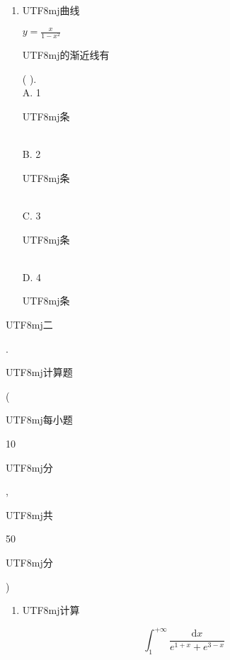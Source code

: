 \documentclass[10pt]{article}
\begin{document}
\begin{enumerate}
  \item \begin{CJK}{UTF8}{mj}曲线\end{CJK} $y=\frac{x}{1-x^{2}}$ \begin{CJK}{UTF8}{mj}的渐近线有\end{CJK} ( ).\\
A. 1 \begin{CJK}{UTF8}{mj}条\end{CJK}\\
B. 2 \begin{CJK}{UTF8}{mj}条\end{CJK}\\
C. 3 \begin{CJK}{UTF8}{mj}条\end{CJK}\\
D. 4 \begin{CJK}{UTF8}{mj}条\end{CJK}

\end{enumerate}
\begin{CJK}{UTF8}{mj}二\end{CJK}. \begin{CJK}{UTF8}{mj}计算题\end{CJK} (\begin{CJK}{UTF8}{mj}每小题\end{CJK} 10 \begin{CJK}{UTF8}{mj}分\end{CJK}, \begin{CJK}{UTF8}{mj}共\end{CJK} 50 \begin{CJK}{UTF8}{mj}分\end{CJK})

\begin{enumerate}
  \item \begin{CJK}{UTF8}{mj}计算\end{CJK}
\end{enumerate}
$$
\int_{1}^{+\infty} \frac{\mathrm{d} x}{e^{1+x}+e^{3-x}}
$$
\end{document}
